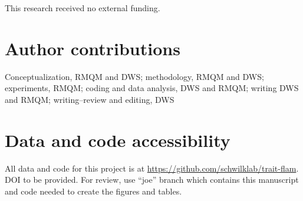 \documentclass[letterpaper,12pt]{article}
\begin{document}
This research received no external funding.

\section*{Author contributions}

Conceptualization, RMQM and DWS; methodology, RMQM and DWS; experiments, RMQM;
coding and data analysis, DWS and RMQM; writing DWS and RMQM; writing--review
and editing, DWS

\section*{Data and code accessibility}
All data and code for this project is at
\url{https://github.com/schwilklab/trait-flam}. DOI to be provided. For review,
use ``joe'' branch which contains this manuscript and code needed to create the
figures and tables.

\newpage




\end{document}
